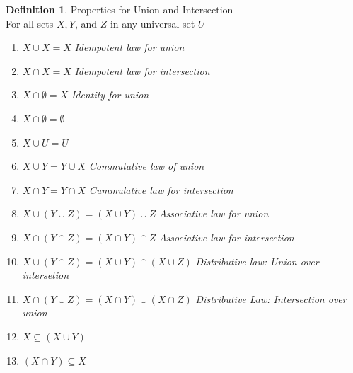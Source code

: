 \documentclass{book}
\theoremstyle{definition}
\newtheorem{definition}{Definition}[section]
\theoremstyle{remark}
\begin{document}
\newpage
\begin{definition}
Properties for Union and Intersection \\

For all sets $X, Y$, and $Z$ in any universal set $U$ \\
    
    \begin{enumerate}
        \item $X \cup X = X$ \textit{Idempotent law for union}
        \item $X \cap X = X$ \textit{Idempotent law for intersection}
        \item $X \cap \emptyset = X$ \textit{Identity for union}
        \item $X \cap \emptyset = \emptyset$
        \item $X \cup U = U$
        \item $X \cup Y = Y \cup X$ \textit{Commutative law of union}
        \item $X \cap Y = Y \cap X$ \textit{Cummulative law for intersection}
        \item $X \cup (Y \cup Z) = (X \cup Y) \cup Z$ \textit{Associative law for union}
        \item $X \cap (Y \cap Z) = (X \cap Y) \cap Z$ \textit{Associative law for intersection}
        \item $X \cup (Y \cap Z) = (X \cup Y) \cap (X \cup Z)$ \textit{Distributive law: Union over intersetion}
        \item $X \cap (Y \cup Z) = (X \cap Y) \cup (X \cap Z)$ \textit{Distributive Law: Intersection over union}
        \item $X \subseteq (X \cup Y)$
        \item $(X \cap Y) \subseteq X$
    \end{enumerate}
\end{definition}
\end{document}
